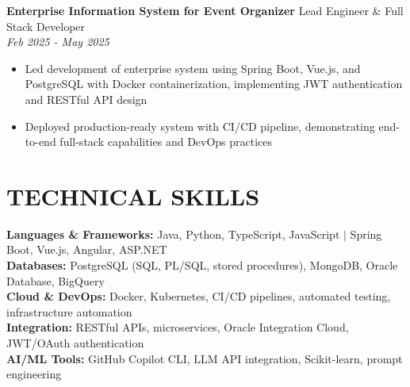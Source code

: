 \documentclass[10pt,a4paper]{article}
\newcommand{\experienceheader}[4]{
    \textbf{#1} \hfill #2 \\
    \textit{#3} \hfill \textit{#4}
}
\begin{document}
\experienceheader{Enterprise Information System for Event Organizer}{Lead Engineer \& Full Stack Developer}{}{Feb 2025 - May 2025}
\begin{itemize}[leftmargin=*, itemsep=1pt, topsep=1pt]
    \item Led development of enterprise system using Spring Boot, Vue.js, and PostgreSQL with Docker containerization, implementing JWT authentication and RESTful API design
    \item Deployed production-ready system with CI/CD pipeline, demonstrating end-to-end full-stack capabilities and DevOps practices
\end{itemize}


\section*{TECHNICAL SKILLS}

\textbf{Languages \& Frameworks:} Java, Python, TypeScript, JavaScript $|$ Spring Boot, Vue.js, Angular, ASP.NET \\
\textbf{Databases:} PostgreSQL (SQL, PL/SQL, stored procedures), MongoDB, Oracle Database, BigQuery \\
\textbf{Cloud \& DevOps:} Docker, Kubernetes, CI/CD pipelines, automated testing, infrastructure automation \\
\textbf{Integration:} RESTful APIs, microservices, Oracle Integration Cloud, JWT/OAuth authentication \\
\textbf{AI/ML Tools:} GitHub Copilot CLI, LLM API integration, Scikit-learn, prompt engineering

% 
\end{document}
